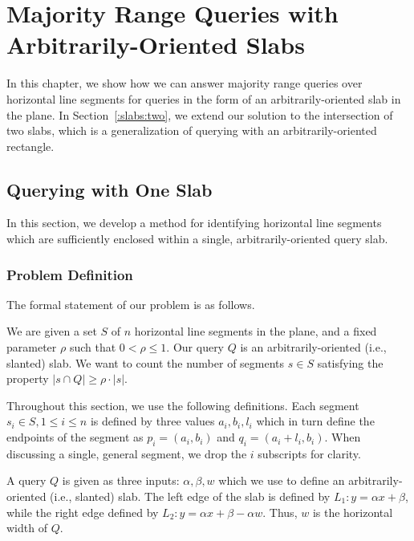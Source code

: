 \chapter{Majority Range Queries with Arbitrarily-Oriented Slabs}
\label{:slabs}

In this chapter, we show how we can answer majority range queries over horizontal line segments for queries in the form of an arbitrarily-oriented slab in the plane.  In Section~\ref{:slabs:two}, we extend our solution to the intersection of two slabs, which is a generalization of querying with an arbitrarily-oriented rectangle.

\section{Querying with One Slab}
\label{:slabs:one}

In this section, we develop a method for identifying horizontal line segments which are sufficiently enclosed within a single, arbitrarily-oriented query slab.


\subsection{Problem Definition}
\label{:slabs:one:problem-definition}

The formal statement of our problem is as follows.

\begin{problem}
We are given a set $S$ of $n$ horizontal line segments in the plane, and a fixed parameter $\rho$ such that $0 < \rho \leq 1$. Our query $Q$ is an arbitrarily-oriented (i.e., slanted) slab. We want to count the number of segments $s \in S$ satisfying the property $|s \cap Q| \geq \rho \cdot |s|$.
\end{problem}

Throughout this section, we use the following definitions. Each segment $s_i \in S, 1 \leq i \leq n$ is defined by three values $a_i, b_i, l_i$ which in turn define the endpoints of the segment as $p_i = (a_i, b_i)$ and $q_i = (a_i + l_i, b_i)$. When discussing a single, general segment, we drop the $i$ subscripts for clarity.

A query $Q$ is given as three inputs: $\alpha, \beta, w$ which we use to define an arbitrarily-oriented (i.e., slanted) slab. The left edge of the slab is defined by $L_1 : y = \alpha x + \beta$, while the right edge defined by $L_2: y = \alpha x + \beta - \alpha w$. Thus, $w$ is the horizontal width of $Q$.

